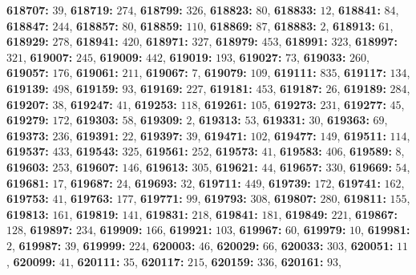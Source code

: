 \textsf{\bfseries 618707:} $39$, \textsf{\bfseries 618719:} $274$, \textsf{\bfseries 618799:} $326$, \textsf{\bfseries 618823:} $80$, \textsf{\bfseries 618833:} $12$, \textsf{\bfseries 618841:} $84$, \textsf{\bfseries 618847:} $244$, \textsf{\bfseries 618857:} $80$, \textsf{\bfseries 618859:} $110$, \textsf{\bfseries 618869:} $87$, \textsf{\bfseries 618883:} $2$, \textsf{\bfseries 618913:} $61$, \textsf{\bfseries 618929:} $278$, \textsf{\bfseries 618941:} $420$, \textsf{\bfseries 618971:} $327$, \textsf{\bfseries 618979:} $453$, \textsf{\bfseries 618991:} $323$, \textsf{\bfseries 618997:} $321$, \textsf{\bfseries 619007:} $245$, \textsf{\bfseries 619009:} $442$, \textsf{\bfseries 619019:} $193$, \textsf{\bfseries 619027:} $73$, \textsf{\bfseries 619033:} $260$, \textsf{\bfseries 619057:} $176$, \textsf{\bfseries 619061:} $211$, \textsf{\bfseries 619067:} $7$, \textsf{\bfseries 619079:} $109$, \textsf{\bfseries 619111:} $835$, \textsf{\bfseries 619117:} $134$, \textsf{\bfseries 619139:} $498$, \textsf{\bfseries 619159:} $93$, \textsf{\bfseries 619169:} $227$, \textsf{\bfseries 619181:} $453$, \textsf{\bfseries 619187:} $26$, \textsf{\bfseries 619189:} $284$, \textsf{\bfseries 619207:} $38$, \textsf{\bfseries 619247:} $41$, \textsf{\bfseries 619253:} $118$, \textsf{\bfseries 619261:} $105$, \textsf{\bfseries 619273:} $231$, \textsf{\bfseries 619277:} $45$, \textsf{\bfseries 619279:} $172$, \textsf{\bfseries 619303:} $58$, \textsf{\bfseries 619309:} $2$, \textsf{\bfseries 619313:} $53$, \textsf{\bfseries 619331:} $30$, \textsf{\bfseries 619363:} $69$, \textsf{\bfseries 619373:} $236$, \textsf{\bfseries 619391:} $22$, \textsf{\bfseries 619397:} $39$, \textsf{\bfseries 619471:} $102$, \textsf{\bfseries 619477:} $149$, \textsf{\bfseries 619511:} $114$, \textsf{\bfseries 619537:} $433$, \textsf{\bfseries 619543:} $325$, \textsf{\bfseries 619561:} $252$, \textsf{\bfseries 619573:} $41$, \textsf{\bfseries 619583:} $406$, \textsf{\bfseries 619589:} $8$, \textsf{\bfseries 619603:} $253$, \textsf{\bfseries 619607:} $146$, \textsf{\bfseries 619613:} $305$, \textsf{\bfseries 619621:} $44$, \textsf{\bfseries 619657:} $330$, \textsf{\bfseries 619669:} $54$, \textsf{\bfseries 619681:} $17$, \textsf{\bfseries 619687:} $24$, \textsf{\bfseries 619693:} $32$, \textsf{\bfseries 619711:} $449$, \textsf{\bfseries 619739:} $172$, \textsf{\bfseries 619741:} $162$, \textsf{\bfseries 619753:} $41$, \textsf{\bfseries 619763:} $177$, \textsf{\bfseries 619771:} $99$, \textsf{\bfseries 619793:} $308$, \textsf{\bfseries 619807:} $280$, \textsf{\bfseries 619811:} $155$, \textsf{\bfseries 619813:} $161$, \textsf{\bfseries 619819:} $141$, \textsf{\bfseries 619831:} $218$, \textsf{\bfseries 619841:} $181$, \textsf{\bfseries 619849:} $221$, \textsf{\bfseries 619867:} $128$, \textsf{\bfseries 619897:} $234$, \textsf{\bfseries 619909:} $166$, \textsf{\bfseries 619921:} $103$, \textsf{\bfseries 619967:} $60$, \textsf{\bfseries 619979:} $10$, \textsf{\bfseries 619981:} $2$, \textsf{\bfseries 619987:} $39$, \textsf{\bfseries 619999:} $224$, \textsf{\bfseries 620003:} $46$, \textsf{\bfseries 620029:} $66$, \textsf{\bfseries 620033:} $303$, \textsf{\bfseries 620051:} $11$, \textsf{\bfseries 620099:} $41$, \textsf{\bfseries 620111:} $35$, \textsf{\bfseries 620117:} $215$, \textsf{\bfseries 620159:} $336$, \textsf{\bfseries 620161:} $93$, 
